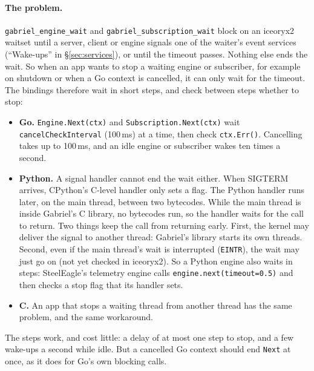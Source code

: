 \documentclass[11pt]{article}
\newcommand{\code}[1]{\texttt{#1}}
\begin{document}
\paragraph{The problem.} \code{gabriel\_engine\_wait} and
\code{gabriel\_subscription\_wait} block on an iceoryx2 waitset until a
server, client or engine signals one of the waiter's event services
(``Wake-ups'' in \S\ref{sec:services}), or until the timeout passes. Nothing
else ends the wait. So when an app wants to stop a waiting engine or
subscriber, for example on shutdown or when a Go context is cancelled, it can
only wait for the timeout. The bindings therefore wait in short steps, and
check between steps whether to stop:
\begin{itemize}[nosep]
  \item \textbf{Go.} \code{Engine.Next(ctx)} and \code{Subscription.Next(ctx)}
        wait \code{cancelCheckInterval} (100\,ms) at a time, then check
        \code{ctx.Err()}. Cancelling takes up to 100\,ms, and an idle engine
        or subscriber wakes ten times a second.
  \item \textbf{Python.} A signal handler cannot end the wait either. When
        SIGTERM arrives, CPython's C-level handler only sets a flag. The
        Python handler runs later, on the main thread, between two bytecodes.
        While the main thread is inside Gabriel's C library, no bytecodes run,
        so the handler waits for the call to return. Two things keep the call
        from returning early. First, the kernel may deliver the signal to
        another thread: Gabriel's library starts its own threads. Second, even
        if the main thread's wait is interrupted (\code{EINTR}), the wait may
        just go on (not yet checked in iceoryx2). So a Python engine also waits
        in steps: SteelEagle's telemetry engine calls
        \code{engine.next(timeout=0.5)} and then checks a stop flag that its
        handler sets.
  \item \textbf{C.} An app that stops a waiting thread from another thread has
        the same problem, and the same workaround.
\end{itemize}
The steps work, and cost little: a delay of at most one step to stop, and a
few wake-ups a second while idle. But a cancelled Go context should end
\code{Next} at once, as it does for Go's own blocking calls.
\end{document}
